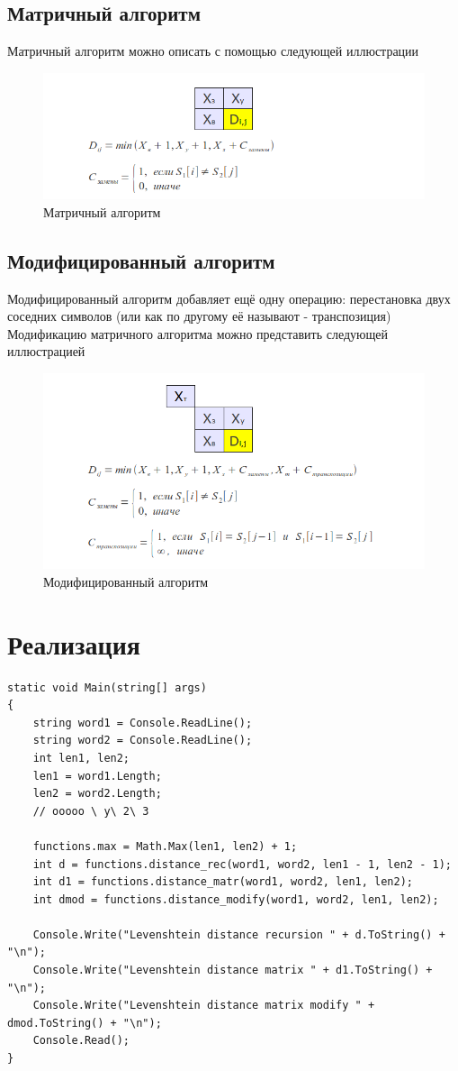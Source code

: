 \documentclass[a4paper,12pt]{article}
\begin{document}
    \subsection{Матричный алгоритм}
    Матричный алгоритм можно описать с помощью следующей иллюстрации
    \begin{figure}[H]
    \includegraphics[scale=0.7]{leven}
    \caption{Матричный алгоритм}
    \end{figure}
    \subsection{Модифицированный алгоритм}
    Модифицированный алгоритм добавляет ещё одну операцию: перестановка двух соседних символов (или как по другому её называют - транспозиция)
    Модификацию матричного алгоритма можно представить следующей иллюстрацией
    \begin{figure}[H]
    \includegraphics[scale=0.7]{levenmod}
    \caption{Модифицированный алгоритм}
    \end{figure}
\section{Реализация}
\begin{lstlisting}[label=some-code,caption={main}]
static void Main(string[] args)
{
    string word1 = Console.ReadLine();
    string word2 = Console.ReadLine();
    int len1, len2;
    len1 = word1.Length;
    len2 = word2.Length;
    // ооооо \ у\ 2\ 3

    functions.max = Math.Max(len1, len2) + 1;
    int d = functions.distance_rec(word1, word2, len1 - 1, len2 - 1);
    int d1 = functions.distance_matr(word1, word2, len1, len2);
    int dmod = functions.distance_modify(word1, word2, len1, len2);

    Console.Write("Levenshtein distance recursion " + d.ToString() + "\n");
    Console.Write("Levenshtein distance matrix " + d1.ToString() + "\n");
    Console.Write("Levenshtein distance matrix modify " + dmod.ToString() + "\n");
    Console.Read();
}
\end{lstlisting}
\end{document}
